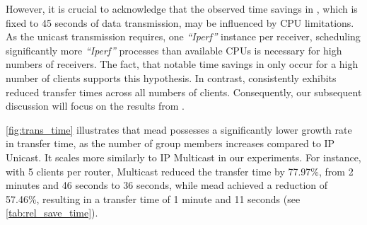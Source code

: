However, it is crucial to acknowledge that the observed time savings in \uci{},
    which is fixed to 45 seconds of data transmission, may be influenced by CPU
    limitations.
As the unicast transmission requires, one \textit{``Iperf''} instance per
    receiver, scheduling significantly more \textit{``Iperf''} processes than
    available CPUs is necessary for high numbers of receivers.
The fact, that notable time savings in \uci{} only occur for a high number of
    clients supports this hypothesis.
In contrast, \ucii{} consistently exhibits reduced transfer times across all
    numbers of clients.
Consequently, our subsequent discussion will focus on the results from \ucii{}.

\autoref{fig:trans_time} illustrates that \gls{mead} possesses a significantly
    lower growth rate in transfer time, as the number of group members
    increases compared to IP Unicast.
It scales more similarly to IP Multicast in our experiments.
For instance, with 5 clients per router, Multicast reduced the transfer time
    by 77.97\%, from 2 minutes and 46 seconds to 36 seconds, while \gls{mead} 
    achieved a reduction of 57.46\%, resulting in a transfer time of 1 minute
    and 11 seconds (see \autoref{tab:rel_save_time}).




